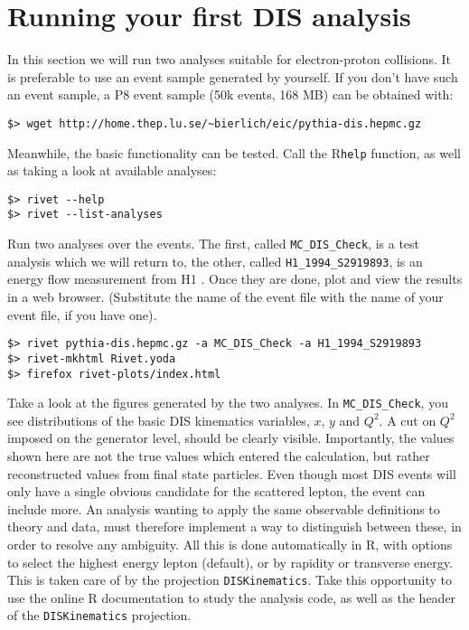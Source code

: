 \documentclass[11pt]{article}
\newcommand{\pythia}{P\protect\scalebox{0.8}{YTHIA}8\xspace}
\newcommand{\rivet}{R\protect\scalebox{0.8}{IVET}\xspace}
\begin{document}
\section{Running your first DIS analysis}
In this section we will run two analyses suitable for electron-proton collisions. It is preferable to use an event sample generated by yourself. If you don't have such an event sample, a \pythia event sample (50k events, 168 MB) can be obtained with:

\begin{verbatim}
$> wget http://home.thep.lu.se/~bierlich/eic/pythia-dis.hepmc.gz
\end{verbatim}
Meanwhile, the basic functionality can be tested. Call the \rivet \texttt{help} function, as well as taking a look at available analyses:
\begin{verbatim}
$> rivet --help
$> rivet --list-analyses
\end{verbatim}

Run two analyses over the events. The first, called \texttt{MC\_DIS\_Check}, is a test analysis which we will return to, the other, called \texttt{H1\_1994\_S2919893}, is an energy flow measurement from H1 \cite{Abt:1994ye}. Once they are done, plot and view the results in a web browser. (Substitute the name of the event file with the name of your event file, if you have one).

\begin{verbatim}
$> rivet pythia-dis.hepmc.gz -a MC_DIS_Check -a H1_1994_S2919893
$> rivet-mkhtml Rivet.yoda
$> firefox rivet-plots/index.html
\end{verbatim}

Take a look at the figures generated by the two analyses. In \texttt{MC\_DIS\_Check}, you see distributions of the basic DIS kinematics variables, $x$, $y$ and $Q^2$. A cut on $Q^2$ imposed on the generator level, should be clearly visible. Importantly, the values shown here are not the true values which entered the calculation, but rather reconstructed values from final state particles. Even though most DIS events will only have a single obvious candidate for the scattered lepton, the event can include more. An analysis wanting to apply the same observable definitions to theory and data, must therefore implement a way to distinguish between these, in order to resolve any ambiguity. All this is done automatically in \rivet, with options to select the highest energy lepton (default), or by rapidity or transverse energy. This is taken care of by the projection \texttt{DISKinematics}. Take this opportunity to use the online \rivet documentation to study the analysis code, as well as the header of the \texttt{DISKinematics} projection.
\end{document}
